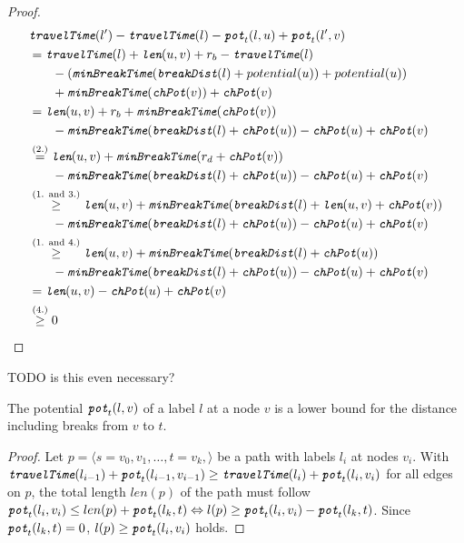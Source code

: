 \begin{proof}
	\begin{align}
		\begin{split}\label{eq:label_feasibility_proof_2}
			&\concretett(l') - \concretett(l) - \concretepotential_t(l,u) + \concretepotential_t(l',v)\\
			&= \concretett(l) + \len(u,v) + \restr_b - \concretett(l)\\
			& \phantom{{}=1} - (\minBreakTime(\breakDist(l)+potential(u)) + potential(u))\\
			& \phantom{{}=1} + \minBreakTime(\chpotential(v)) + \chpotential(v)\\
			&=  \len(u,v) + \restr_b + \minBreakTime(\chpotential(v))\\
			& \phantom{{}=1} - \minBreakTime(\breakDist(l)+\chpotential(u)) - \chpotential(u) + \chpotential(v)\\
			&\stackrel{\text{(2.)}}{=}  \len(u,v) + \minBreakTime(\restr_d + \chpotential(v))\\
			& \phantom{{}=1} - \minBreakTime(\breakDist(l)+\chpotential(u)) - \chpotential(u) + \chpotential(v)\\
			&\stackrel{\text{(1. and 3.)}}{\ge} \len(u,v) + \minBreakTime(\breakDist(l) + \len(u,v) + \chpotential(v))\\
			& \phantom{{}=1} - \minBreakTime(\breakDist(l)+\chpotential(u)) - \chpotential(u) + \chpotential(v)\\
			&\stackrel{\text{(1. and 4.)}}{\ge} \len(u,v) + \minBreakTime(\breakDist(l) + \chpotential(u))\\
			& \phantom{{}=1} - \minBreakTime(\breakDist(l)+\chpotential(u)) - \chpotential(u) + \chpotential(v)\\
			&=  \len(u,v) - \chpotential(u) + \chpotential(v)\\
			&\stackrel{\text{(4.)}}{\ge} 0
		\end{split}
	\end{align}
\end{proof}

TODO is this even necessary?
\begin{lemma}\label{lemma:pot_lower_boundist_csp}
	The potential $\texttt{\itshape pot}_t(l,v)$ of a label $l$ at a node $v$ is a lower bound for the distance including breaks from $v$ to $t$.
\end{lemma}

\begin{proof}
	Let $p = \langle s=v_0,v_1,\ldots,t=v_k, \rangle$ be a path with labels $l_i$ at nodes $v_i$. With $\texttt{\itshape travelTime}(l_{i-1}) + \texttt{\itshape pot}_t(l_{i-1},v_{i-1}) \ge \texttt{\itshape travelTime}(l_{i}) + \texttt{\itshape pot}_t(l_i,v_i)$ for all edges on $p$, the total length $len(p)$ of the path must follow $\texttt{\itshape pot}_t(l_i,v_i) \le len(p) + \texttt{\itshape pot}_t(l_k,t) \Leftrightarrow l(p) \ge \texttt{\itshape pot}_t(l_i,v_i) - \texttt{\itshape pot}_t(l_k,t)$. Since $\texttt{\itshape pot}_t(l_k,t) = 0$, $l(p) \ge \texttt{\itshape pot}_t(l_i,v_i)$ holds.
\end{proof}

